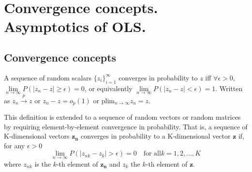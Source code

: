 \documentclass[DIV=14,titlepage=false]{scrreprt}
\begin{document}
\vspace{-10pt}
\setcounter{chapter}{5}

\chapter{Convergence concepts. Asymptotics of OLS.}
\vspace{-10pt}
\section{Convergence concepts}
\begin{definition}
    A sequence of random scalars $\{ z_i \}_{i=1}^{\infty}$ converges in probability to $z$ iff $\forall \epsilon>$0, $\underset{ n \to \infty}{\lim} P(|z_n-z|\geq\epsilon)=0$, or equivalently $\underset{ n \to \infty}{\lim} P(|z_n-z|<\epsilon)=1.$ Written as $z_n \overset{p}{\to}z$ or $z_n-z = o_p(1)$ or plim$_{ n \to \infty}z_n=z$.
\end{definition}

This definition is extended to a sequence of random vectors or random matrices by requiring element-by-element convergence in probability. That is, a sequence of K-dimensional vectors {$\mathbf{z_n}$} converges in probability to a K-dimensional vector $\mathbf{z}$ if, for any $\epsilon>0$ \[\underset{ n \to \infty}{\lim} P(|z_{nk}-z_k|>\epsilon)=0 \quad \text{for all} k=1,2,...,K \] where $z_{nk}$ is the $k$-th element of $\mathbf{z_n}$ and $z_k$ the $k$-th element of $\mathbf{z}$.
\end{document}
